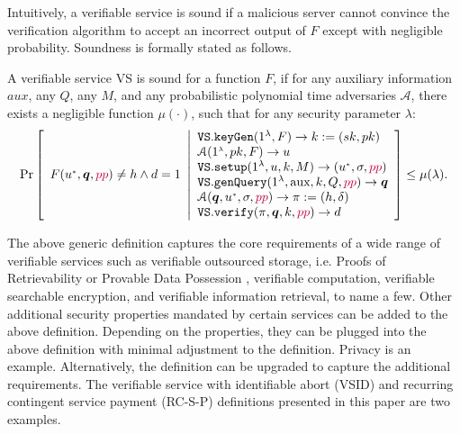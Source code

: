 Intuitively, a verifiable service is sound  if a malicious server cannot convince the verification algorithm to accept an incorrect output of $F$ except with negligible probability. %
Soundness is formally stated as follows.




\begin{definition}[VS Soundness] A verifiable service VS is sound  for a function $F$, if for any auxiliary information $aux$, any  $Q$,  any $M$, and any probabilistic polynomial time adversaries $\mathcal{A}$, there exists a negligible function $\mu(\cdot)$, such that for any security parameter $\lambda$: 
\small{
$$ \Pr\left[
  \begin{array}{l}
F(u^{\scriptscriptstyle *},\bm{q},{\color{purple}pp})\neq h \wedge d=1
\end{array} \middle | 
    \begin{array} {l}
 \mathtt{VS.keyGen}(1^{\lambda},F)\rightarrow k:=(sk,pk)\\
 \mathcal{A}(1^{\scriptscriptstyle\lambda},pk, F)\rightarrow u\\
\mathtt{VS.setup}(1^{\lambda}, u,k,M)\rightarrow (u^{\scriptscriptstyle *},\sigma, {\color{purple}pp})\\
 \mathtt{VS.genQuery}(1^{\lambda}, \text{aux},k,Q,{\color{purple}pp})\rightarrow \bm{q}\\
 \mathcal{A}(\bm{q},u^{\scriptscriptstyle *},\sigma,{\color{purple}pp})\rightarrow \pi:=(h,\delta)\\
 \mathtt{VS.verify}(\pi,\bm{q},k,{\color{purple}pp})\rightarrow d\\
\end{array}    \right]\leq \mu(\lambda).$$
}
\end{definition}




The above generic definition captures the core requirements of a wide range of verifiable services such as verifiable outsourced storage, i.e. Proofs of Retrievability \cite{DBLP:journals/iacr/JuelsK07,DBLP:conf/asiacrypt/ShachamW08} or Provable Data Possession \cite{DBLP:conf/ccs/AtenieseBCHKPS07,ShenT11}, verifiable computation, verifiable searchable encryption, and verifiable information retrieval, to name a few. Other additional  security properties mandated by certain services can be added to the above definition. Depending on the properties,  they can be  plugged into  the above definition with minimal adjustment to the definition. Privacy is an example. Alternatively, the definition can be upgraded to capture the  additional requirements.  The verifiable service with identifiable abort (VSID) and recurring contingent service payment (RC-S-P) definitions presented in this paper are two examples. 



